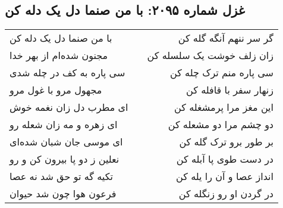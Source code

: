\begin{center}
\section*{غزل شماره ۲۰۹۵: با من صنما دل یک دله کن}
\label{sec:2095}
\begin{longtable}{l p{0.5cm} r}
با من صنما دل یک دله کن
&&
گر سر ننهم آنگه گله کن
\\
مجنون شده‌ام از بهر خدا
&&
زان زلف خوشت یک سلسله کن
\\
سی پاره به کف در چله شدی
&&
سی پاره منم ترک چله کن
\\
مجهول مرو با غول مرو
&&
زنهار سفر با قافله کن
\\
ای مطرب دل زان نغمه خوش
&&
این مغز مرا پرمشغله کن
\\
ای زهره و مه زان شعله رو
&&
دو چشم مرا دو مشعله کن
\\
ای موسی جان شبان شده‌ای
&&
بر طور برو ترک گله کن
\\
نعلین ز دو پا بیرون کن و رو
&&
در دست طوی پا آبله کن
\\
تکیه گه تو حق شد نه عصا
&&
انداز عصا و آن را یله کن
\\
فرعون هوا چون شد حیوان
&&
در گردن او رو زنگله کن
\\
\end{longtable}
\end{center}
